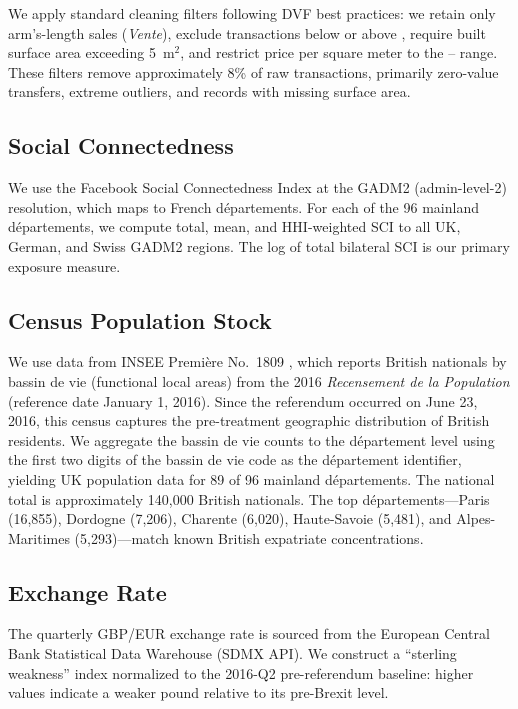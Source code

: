 \documentclass[12pt]{article}
\begin{document}
We apply standard cleaning filters following DVF best practices: we retain only arm's-length sales (\textit{Vente}), exclude transactions below  or above , require built surface area exceeding 5~m$^2$, and restrict price per square meter to the -- range. These filters remove approximately 8\% of raw transactions, primarily zero-value transfers, extreme outliers, and records with missing surface area.

\subsection{Social Connectedness}

We use the Facebook Social Connectedness Index at the GADM2 (admin-level-2) resolution, which maps to French d\'epartements. For each of the 96 mainland d\'epartements, we compute total, mean, and HHI-weighted SCI to all UK, German, and Swiss GADM2 regions. The log of total bilateral SCI is our primary exposure measure.

\subsection{Census Population Stock}

We use data from INSEE Premi\`ere No.\ 1809 \citep{insee2019premiere}, which reports British nationals by bassin de vie (functional local areas) from the 2016 \textit{Recensement de la Population} (reference date January 1, 2016). Since the referendum occurred on June 23, 2016, this census captures the pre-treatment geographic distribution of British residents. We aggregate the bassin de vie counts to the d\'epartement level using the first two digits of the bassin de vie code as the d\'epartement identifier, yielding UK population data for 89 of 96 mainland d\'epartements. The national total is approximately 140,000 British nationals. The top d\'epartements---Paris (16,855), Dordogne (7,206), Charente (6,020), Haute-Savoie (5,481), and Alpes-Maritimes (5,293)---match known British expatriate concentrations.

\subsection{Exchange Rate}

The quarterly GBP/EUR exchange rate is sourced from the European Central Bank Statistical Data Warehouse (SDMX API). We construct a ``sterling weakness'' index normalized to the 2016-Q2 pre-referendum baseline: higher values indicate a weaker pound relative to its pre-Brexit level.
\end{document}
